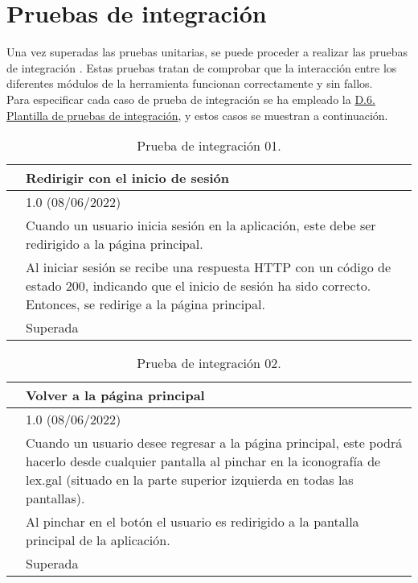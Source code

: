 \section{Pruebas de integración}

Una vez superadas las pruebas unitarias, se puede proceder a realizar las pruebas de integración \cite{pruebaintegracion}. Estas pruebas tratan de comprobar que la interacción entre los diferentes módulos de la herramienta funcionan correctamente y sin fallos. 
\\

Para especificar cada caso de prueba de integración se ha empleado la \hyperref[enlacePIX]{D.6. Plantilla de pruebas de integración}, y estos casos se muestran a continuación.

\begin{table}[H]
\begin{center}
\begin{tabular}{|p{3cm}|p{10cm}|} \hline
\centering {\bf PI-01} & Redirigir con el inicio de sesión  \\ \hline\hline
\centering {\bf Versión} & 1.0 (08/06/2022) \\ \hline
\centering {\bf Descripción} & Cuando un usuario inicia sesión en la aplicación, este debe ser redirigido a la página principal. \\ \hline
\centering {\bf Criterio de aceptación} & Al iniciar sesión se recibe una respuesta HTTP con un código de estado 200, indicando que el inicio de sesión ha sido correcto. Entonces, se redirige a la página principal. \\ \hline
\centering {\bf Estado} & Superada \\ \hline
\end{tabular}
\caption{Prueba de integración 01.}
\label{enlacePI1}
\end{center}
\end{table}

\begin{table}[H]
\begin{center}
\begin{tabular}{|p{3cm}|p{10cm}|} \hline
\centering {\bf PI-02} & Volver a la página principal  \\ \hline\hline
\centering {\bf Versión} & 1.0 (08/06/2022) \\ \hline
\centering {\bf Descripción} & Cuando un usuario desee regresar a la página principal, este podrá hacerlo desde cualquier pantalla al pinchar en la iconografía de lex.gal (situado en la parte superior izquierda en todas las pantallas). \\ \hline
\centering {\bf Criterio de aceptación} & Al pinchar en el botón el usuario es redirigido a la pantalla principal de la aplicación. \\ \hline
\centering {\bf Estado} & Superada \\ \hline
\end{tabular}
\caption{Prueba de integración 02.}
\label{enlacePI2}
\end{center}
\end{table}

